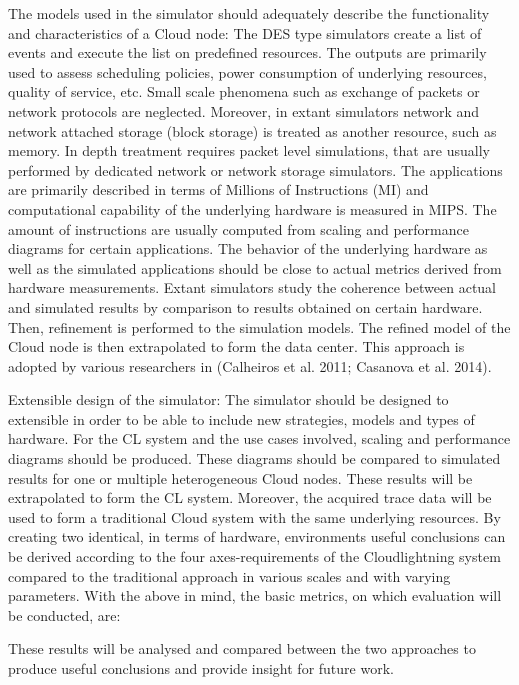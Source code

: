 The models used in the simulator should adequately describe the functionality and characteristics of a Cloud node: The DES type simulators create a list of events and execute the list on predefined resources. The outputs are primarily used to assess scheduling policies, power consumption of underlying resources, quality of service, etc. Small scale phenomena such as exchange of packets or network protocols are neglected. Moreover, in extant simulators network and network attached storage (block storage) is treated as another resource, such as memory. In depth treatment requires packet level simulations, that are usually performed by dedicated network or network storage simulators. The applications are primarily described in terms of Millions of Instructions (MI) and computational capability of the underlying hardware is measured in MIPS. The amount of instructions are usually computed from scaling and performance diagrams for certain applications. The behavior of the underlying hardware as well as the simulated applications should be close to actual metrics derived from hardware measurements. Extant simulators study the coherence between actual and simulated results by comparison to results obtained on certain hardware. Then, refinement is performed to the simulation models. The refined model of the Cloud node is then extrapolated to form the data center. This approach is adopted by various researchers in (Calheiros et al. 2011; Casanova et al. 2014).

Extensible design of the simulator: The simulator should be designed to extensible in order to be able to include new strategies, models and types of hardware. For the CL system and the use cases involved, scaling and performance diagrams should be produced. These diagrams should be compared to simulated results for one or multiple heterogeneous Cloud nodes.  These results will be extrapolated to form the CL system. Moreover, the acquired trace data will be used to form a traditional Cloud system with the same underlying resources. By creating two identical, in terms of hardware, environments useful conclusions can be derived according to the four axes-requirements of the Cloudlightning system compared to the traditional approach in various scales and with varying parameters. With the above in mind, the basic metrics, on which evaluation will be conducted, are:



These results will be analysed and compared between the two approaches to produce useful conclusions and provide insight for future work.



